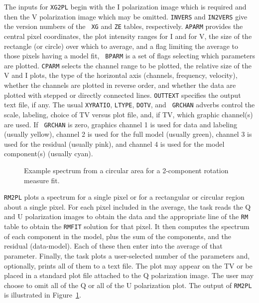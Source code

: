\documentclass[twoside]{article}
\newcommand{\Me}[1]{\textcolor{mecol}{#1}}
\newcommand{\putfig}[1]{\texttt{[image: \#1.eps]}}
\begin{document}
The inputs for {\tt XG2PL} begin with the I polarization image which
is required and then the V polarization image which may be omitted.
{\tt INVERS} and {\tt IN2VERS} give the version numbers of the {\tt
  XG} and {\tt ZE} tables, respectively.  {\tt APARM} provides the
central pixel coordinates, the plot intensity ranges for I and for V,
the size of the rectangle (or circle) over which to average, and a
flag limiting the average to those pixels having a model fit,  {\tt
  BPARM} is a set of flags selecting which parameters are plotted.
{\tt CPARM} selects the channel range to be plotted, the relative size
of the V and I plots, the type of the horizontal axis (channels,
frequency, velocity), whether the channels are plotted in reverse
order, and whether the data are plotted with stepped or directly
connected lines.  {\tt OUTTEXT} specifies the output text file, if
any.  The usual {\tt XYRATIO}, {\tt LTYPE}, {\tt DOTV}, and {\tt
  GRCHAN} adverbs control the scale, labeling, choice of TV versus
plot file, and, if TV, which graphic channel(s) are used.  If {\tt
  GRCHAN} is zero, graphics channel 1 is used for data and labeling
(usually yellow), channel 2 is used for the full model (usually
green), channel 3 is used for the residual (usually pink), and channel 4
is used for the model component(s) (usually cyan).

\begin{figure}
\begin{center}
\resizebox{6.0in}{!}{\putfig{RM2PL}}
\caption{\Me{Example spectrum from a circular area for a 2-component
  rotation measure fit.}}
\label{fig:RM2PL}
\end{center}
\end{figure}

{\tt RM2PL} plots a spectrum for a single pixel or for a rectangular
or circular region about a single pixel.  For each pixel included in
the average, the task reads the Q and U polarization images to obtain
the data and the appropriate line of the {\tt RM} table to obtain the
{\tt RMFIT} solution for that pixel.  It then computes the spectrum of
each component in the model, plus the sum of the components, and the
residual (data-model).  Each of these then enter into the average of
that parameter.  Finally, the task plots a user-selected number of the
parameters and, optionally, prints all of them to a text file.  The
plot may appear on the TV or be placed in a standard plot file
attached to the Q polarization image.  The user may choose to omit all
of the Q or all of the U polarization plot.  The output of {\tt RM2PL}
is illustrated in Figure~\ref{fig:RM2PL}.
\end{document}
